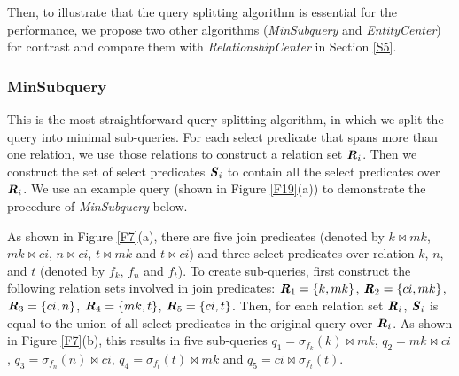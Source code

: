         Then, to illustrate that the query splitting algorithm is essential for the performance, we propose two other algorithms (\textit{MinSubquery} and \textit{EntityCenter}) for contrast and compare them with \textit{RelationshipCenter} in Section \ref{S5}.

    \subsubsection{MinSubquery} \label{S411}
        This is the most straightforward query splitting algorithm, in which we split the query into minimal sub-queries. For each select predicate that spans more than one relation, we use those relations to construct a relation set $\textbf{\textit{R}}_i$. Then we construct the set of select predicates $\textbf{\textit{S}}_i$ to contain all the select predicates over $\textbf{\textit{R}}_i$. We use an example query (shown in Figure \ref{F19}(a)) to demonstrate the procedure of \textit{MinSubquery} below.
        \begin{Example}[MinSubquery] \label{E3}
            As shown in Figure \ref{F7}(a), there are five join predicates (denoted by $k \bowtie mk$, $mk \bowtie ci$, $n \bowtie ci$, $t \bowtie mk$ and $t \bowtie ci$) and three select predicates over relation $k$, $n$, and $t$ (denoted by $f_k$, $f_n$ and $f_t$). To create sub-queries, first construct the following relation sets involved in join predicates: $\textbf{\textit{R}}_1=\{k,mk\}$, $\textbf{\textit{R}}_2=\{ci,mk\}$, $\textbf{\textit{R}}_3=\{ci,n\}$, $\textbf{\textit{R}}_4=\{mk,t\}$, $\textbf{\textit{R}}_5=\{ci,t\}$. Then, for each relation set $\textbf{\textit{R}}_i$, $\textbf{\textit{S}}_i$ is equal to the union of all select predicates in the original query over $\textbf{\textit{R}}_i$. As shown in Figure \ref{F7}(b), this results in five sub-queries $q_1=\sigma_{f_k}(k) \bowtie mk$, $q_2=mk \bowtie ci$, $q_3=\sigma_{f_n}(n) \bowtie ci$, $q_4=\sigma_{f_t}(t) \bowtie mk$ and $q_5=ci \bowtie \sigma_{f_t}(t)$.
        \end{Example}

